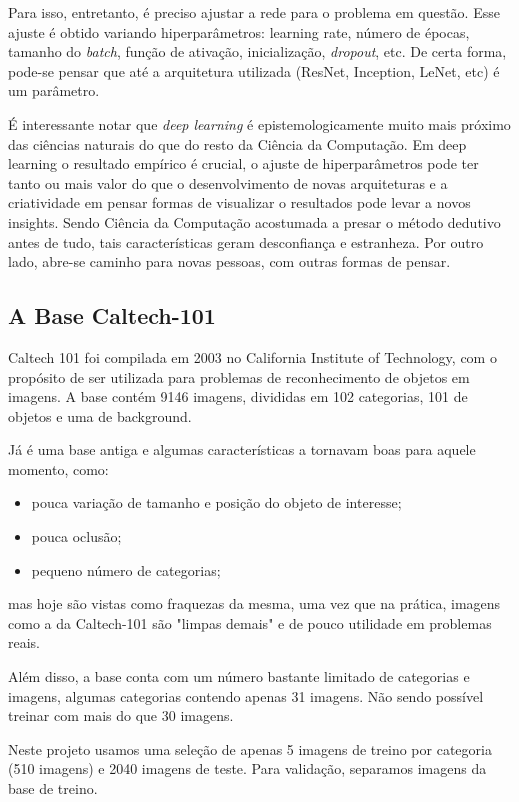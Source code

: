 \documentclass[conference]{IEEEtran}
\begin{document}
Para isso, entretanto, é preciso ajustar a rede para o problema em questão. Esse ajuste é obtido variando hiperparâmetros: learning rate, número de épocas, tamanho do \textit{batch}, função de ativação, inicialização, \textit{dropout}, etc. De certa forma, pode-se pensar que até a arquitetura utilizada (ResNet, Inception, LeNet, etc) é um parâmetro.  

É interessante notar que \textit{deep learning} é epistemologicamente muito mais próximo das ciências naturais do que do resto da Ciência da Computação.  Em deep learning o resultado empírico é crucial, o ajuste de hiperparâmetros pode ter tanto ou mais valor do que o desenvolvimento de novas arquiteturas e a criatividade em pensar formas de visualizar o resultados pode levar a novos insights. Sendo Ciência da Computação acostumada a presar o método dedutivo antes de tudo, tais características geram desconfiança e estranheza.  Por outro lado, abre-se caminho para novas pessoas, com outras formas de pensar.

\subsection{A Base Caltech-101}
Caltech 101 foi compilada em 2003 no California Institute of Technology\cite{caltech101}, com o propósito de ser utilizada para problemas de reconhecimento de objetos em imagens. A base contém 9146 imagens, divididas em 102 categorias, 101 de objetos e uma de background. 

Já é uma base antiga e algumas características a tornavam boas para aquele momento, como:

\begin{itemize}
\item pouca variação de tamanho e posição do objeto de interesse;
\item pouca oclusão;
\item pequeno número de categorias;
\end{itemize}

mas hoje são vistas como fraquezas da mesma, uma vez que na prática, imagens como a da Caltech-101 são "limpas demais" e de pouco utilidade em problemas reais.

Além disso, a base conta com um número bastante limitado de categorias e imagens, algumas categorias contendo apenas 31 imagens. Não sendo possível treinar com mais do que 30 imagens.

Neste projeto usamos uma seleção de apenas 5 imagens de treino por categoria (510 imagens) e 2040 imagens de teste. Para validação, separamos imagens da base de treino.
\end{document}
